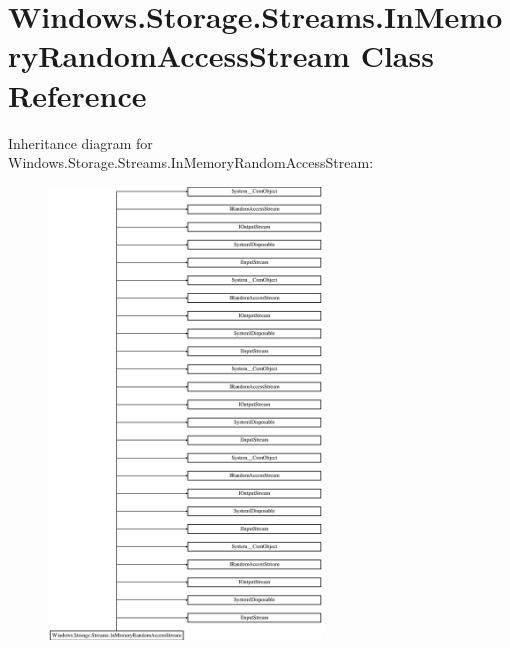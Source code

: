 \hypertarget{class_windows_1_1_storage_1_1_streams_1_1_in_memory_random_access_stream}{}\section{Windows.\+Storage.\+Streams.\+In\+Memory\+Random\+Access\+Stream Class Reference}
\label{class_windows_1_1_storage_1_1_streams_1_1_in_memory_random_access_stream}
Inheritance diagram for Windows.\+Storage.\+Streams.\+In\+Memory\+Random\+Access\+Stream\+:\begin{figure}[H]
\begin{center}
\leavevmode
\includegraphics[height=12.000000cm]{class_windows_1_1_storage_1_1_streams_1_1_in_memory_random_access_stream}
\end{center}
\end{figure}
